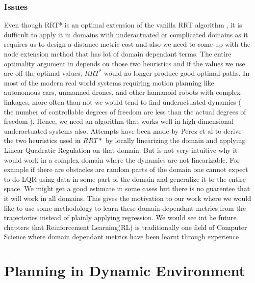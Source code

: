 \documentclass[MTech]{iitmdiss}
\begin{document}
\subsection{Issues}
 
 Even though RRT* is an optimal extension of the vanilla RRT algorithm , it is dufficult to apply it in domains with underactuated or complicated domains 
\cite{perez12}
 as it requires us to design a distance metric cost and also we need to come up with the node extension method that has lot of domain dependant terms. The entire optimality argument in
\cite{karaman11} 
  depends on those two heuristics and if the values we use are off the optimal values, $RRT^*$ would no longer produce good optimal paths. In most of the modern real world systems requiring motion planning like autonomous cars, unmanned drones, and other humanoid robots with complex linkages, more often than not we would tend to find underactuated dynamics ( the number of controllable degrees of freedom are less than the actual degrees of freedom ). Hence, we need an algorithm that works well in high dimensional underactuated systems also. Attempts have been made by Perez et al
\cite{perez12}
     to derive the two heuristics used in $RRT*$ by locally linearizing the domain and applying Linear Quadratic Regulation on that domain. But is not very intuitive why it would work in a complex domain where the dynamics are not linearizable. For example if there are obstacles are random parts of the domain one cannot expect to do LQR using data in some part of the domain and generalize it to the entire space. We might get a good estimate in some cases but there is no guarentee that it will work in all domains. This gives the motivation to our work where we would like to use some methodology to learn these domain dependant metrics from the trajectories instead of plainly applying regression. We would see int he future chapters that Reinforcement Learning(RL) is traditionally one field of Computer Science where domain dependant metrics have been learnt through experience 
 
\chapter{Planning in Dynamic Environment} 
\end{document}
